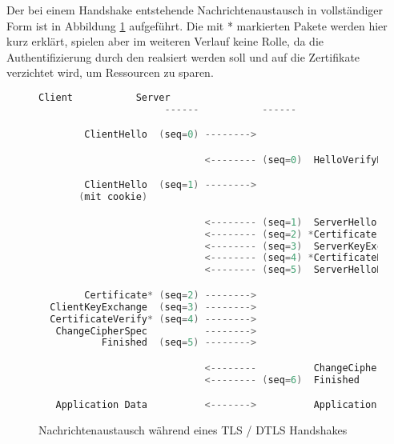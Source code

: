 Der bei einem Handshake entstehende Nachrichtenaustausch in vollständiger Form ist in Abbildung \ref{fig:handshake} aufgeführt.
Die mit * markierten Pakete werden hier kurz erklärt, spielen aber im weiteren Verlauf keine Rolle, da die Authentifizierung durch
den  realsiert werden soll und auf die Zertifikate verzichtet wird, um Ressourcen zu sparen.

\begin{figure}[ht]
  \centering
  \begin{lstlisting}[language=c]
                      Client           Server
                      ------           ------

        ClientHello  (seq=0) -------->

                             <-------- (seq=0)  HelloVerifyRequest    // Nur bei DTLS

        ClientHello  (seq=1) -------->                                // Nur bei DTLS
       (mit cookie)                                                   // Nur bei DTLS

                             <-------- (seq=1)  ServerHello
                             <-------- (seq=2) *Certificate
                             <-------- (seq=3)  ServerKeyExchange
                             <-------- (seq=4) *CertificateRequest
                             <-------- (seq=5)  ServerHelloDone

        Certificate* (seq=2) -------->
  ClientKeyExchange  (seq=3) -------->
  CertificateVerify* (seq=4) -------->
   ChangeCipherSpec          -------->
           Finished  (seq=5) -------->

                             <--------          ChangeCipherSpec
                             <-------- (seq=6)  Finished  

   Application Data          <------->          Application Data
  \end{lstlisting}
  \caption{Nachrichtenaustausch während eines TLS / DTLS Handshakes}
  \label{fig:handshake}
\end{figure}

